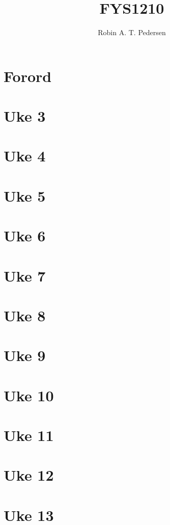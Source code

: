 \documentclass{article}
\begin{document}
  \title{FYS1210}
  \author{Robin A. T. Pedersen}
  \maketitle
  \tableofcontents

  \section{Forord}
    

  \section{Uke 3}
    

  \section{Uke 4}
    

  \section{Uke 5}
  \section{Uke 6}
  \section{Uke 7}
  \section{Uke 8}
  \section{Uke 9}
  \section{Uke 10}
  \section{Uke 11}
  \section{Uke 12}
  \section{Uke 13}
\end{document}
